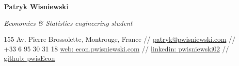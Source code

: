 \documentclass[11pt]{report}
\begin{document}
\hspace*{-\parindent}\hspace{-1em}
\begin{center}\vspace{-1cm}
\begin{Large}\textbf{Patryk Wisniewski\\}\end{Large}
\emph{Economics \& Statistics engineering student}
\end{center}\vspace{0cm}
	 \begin{center}
	 155 Av. Pierre Brossolette, Montrouge, France //
	 \href{mailto:patryk@pwisniewski.com}{patryk@pwisniewski.com} 
	 //
	 +33 6 95 30 31 18 
	\newline
	\href{https://econ.pwisniewski.com}{web: econ.pwisniewski.com}
	 //
	 \href{https://linkedin.com/in/pwisniewski02}{linkedin: pwisniewski02}
	 //
	 \href{https://github.com/pwisEcon}{github: pwisEcon} 
	\end{center}	  

	 


\end{document}
